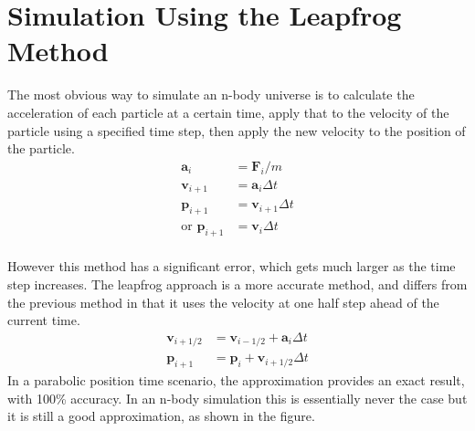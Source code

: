 \documentclass{article}
\begin{document}
\section{Simulation Using the Leapfrog Method}
The most obvious way to simulate an n-body universe is to calculate the acceleration of each particle at a certain time, apply that to the velocity of the particle using a specified time step, then apply the new velocity to the position of the particle.
\begin{align*}
	\mathbf{a}_i &= \mathbf{F}_i/m\\
	\mathbf{v}_{i+1} &= \mathbf{a}_i \Delta t\\
	\mathbf{p}_{i+1} &= \mathbf{v}_{i+1} \Delta t\\ \text{or  }
	\mathbf{p}_{i+1} &= \mathbf{v}_i \Delta t
\end{align*}
\paragraph{}
However this method has a significant error, which gets much larger as the time step increases.
The leapfrog approach is a more accurate method, and differs from the previous method in that it uses the velocity at one half step ahead of the current time.
\begin{align*}
	\mathbf{v}_{i+1/2} &= \mathbf{v}_{i-1/2} + \mathbf{a}_i \Delta t  \\
	\mathbf{p}_{i+1}    &= \mathbf{p}_i + \mathbf{v}_{i + 1/2} \Delta t
\end{align*}
In a parabolic position time scenario, the approximation provides an exact result, with 100\% accuracy.
In an n-body simulation this is essentially never the case but it is still a good approximation, as shown in the figure.\\
\begin{center}
\end{center}
\end{document}
